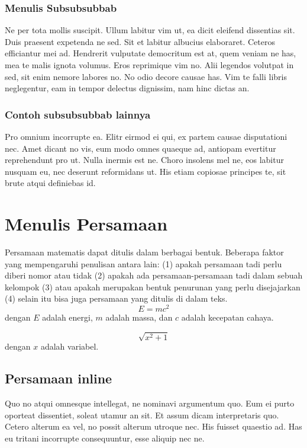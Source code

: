 \subsubsection{Menulis Subsubsubbab}
Ne per tota mollis suscipit. Ullum labitur vim ut, ea dicit eleifend dissentias sit. Duis praesent expetenda ne sed. Sit et labitur albucius elaboraret. Ceteros efficiantur mei ad. Hendrerit vulputate democritum est at, quem veniam ne has, mea te malis ignota volumus. Eros reprimique vim no. Alii legendos volutpat in sed, sit enim nemore labores no. No odio decore causae has. Vim te falli libris neglegentur, eam in tempor delectus dignissim, nam hinc dictas an.

\subsubsection{Contoh subsubsubbab lainnya}
Pro omnium incorrupte ea. Elitr eirmod ei qui, ex partem causae disputationi nec. Amet dicant no vis, eum modo omnes quaeque ad, antiopam evertitur reprehendunt pro ut. Nulla inermis est ne. Choro insolens mel ne, eos labitur nusquam eu, nec deserunt reformidans ut. His etiam copiosae principes te, sit brute atqui definiebas id.



\section{Menulis Persamaan}
Persamaan matematis dapat ditulis dalam berbagai bentuk. Beberapa faktor yang mempengaruhi penulisan antara lain: (1) apakah persamaan tadi perlu diberi nomor atau tidak (2) apakah ada persamaan-persamaan tadi dalam sebuah kelompok (3) atau apakah merupakan bentuk penurunan yang perlu disejajarkan (4) selain itu bisa juga persamaan yang ditulis di dalam teks.
\begin{equation}
E=mc^2
\end{equation}
    dengan $E$ adalah energi, $m$ adalah massa, dan $c$ adalah kecepatan cahaya.

\begin{equation}
\sqrt{x^2+1}
\end{equation}
    dengan $x$ adalah variabel.


\subsection{Persamaan inline}
Quo no atqui omnesque intellegat, ne nominavi argumentum quo. Eum ei purto oporteat dissentiet, soleat utamur an sit. Et assum dicam interpretaris quo. Cetero alterum ea vel, no possit alterum utroque nec. His fuisset quaestio ad. Has eu tritani incorrupte consequuntur, esse aliquip nec ne.
